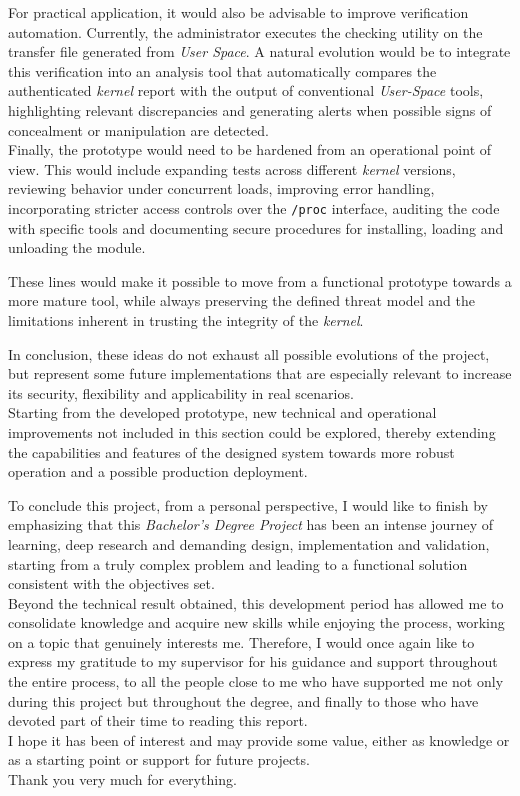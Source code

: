 For practical application, it would also be advisable to improve verification automation.
Currently, the administrator executes the checking utility on the transfer file generated from \textit{User Space}.
A natural evolution would be to integrate this verification into an analysis tool that automatically compares the authenticated \textit{kernel} report with the output of conventional \textit{User-Space} tools, highlighting relevant discrepancies and generating alerts when possible signs of concealment or manipulation are detected.\\

Finally, the prototype would need to be hardened from an operational point of view.
This would include expanding tests across different \textit{kernel} versions, reviewing behavior under concurrent loads, improving error handling, incorporating stricter access controls over the \texttt{/proc} interface, auditing the code with specific tools and documenting secure procedures for installing, loading and unloading the module.

These lines would make it possible to move from a functional prototype towards a more mature tool, while always preserving the defined threat model and the limitations inherent in trusting the integrity of the \textit{kernel}.\\

\newpage

In conclusion, these ideas do not exhaust all possible evolutions of the project, but represent some future implementations that are especially relevant to increase its security, flexibility and applicability in real scenarios.\\

Starting from the developed prototype, new technical and operational improvements not included in this section could be explored, thereby extending the capabilities and features of the designed system towards more robust operation and a possible production deployment.

\newpage
\thispagestyle{plain}

To conclude this project, from a personal perspective, I would like to finish by emphasizing that this \textit{Bachelor's Degree Project} has been an intense journey of learning, deep research and demanding design, implementation and validation, starting from a truly complex problem and leading to a functional solution consistent with the objectives set.\\

Beyond the technical result obtained, this development period has allowed me to consolidate knowledge and acquire new skills while enjoying the process, working on a topic that genuinely interests me.
Therefore, I would once again like to express my gratitude to my supervisor for his guidance and support throughout the entire process, to all the people close to me who have supported me not only during this project but throughout the degree, and finally to those who have devoted part of their time to reading this report.\\

I hope it has been of interest and may provide some value, either as knowledge or as a starting point or support for future projects.\\

Thank you very much for everything.

\newpage
\thispagestyle{plain}
\null
\newpage

